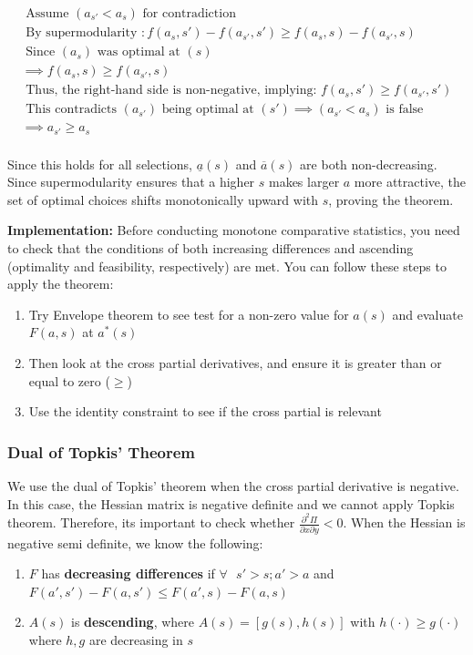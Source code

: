 \documentclass{article}
\begin{document}
\begin{align}
    \text{ Assume } ( a_{s'} < a_s ) \text{ for contradiction } \\
    \text{ By supermodularity }: f(a_s, s') - f(a_{s'}, s') \geq f(a_s, s) - f(a_{s'}, s) \\
    \text{ Since } ( a_s ) \text{ was optimal at } ( s) \\ \implies f(a_s, s) \geq f(a_{s'}, s) \\
    \text{ Thus, the right-hand side is non-negative, implying: } f(a_s, s') \geq f(a_{s'}, s') 
    \\
    \text{ This contradicts } ( a_{s'} ) \text{ being optimal at } ( s' ) \implies ( a_{s'} < a_s )\text{ is false } \\
    \implies  a_{s'} \geq a_s \\ 
\end{align}

Since this holds for all selections, \( \underline{a}(s) \) and \( \overline{a}(s) \) are both non-decreasing. Since supermodularity ensures that a higher \( s \) makes larger \( a \) more attractive, the set of optimal choices shifts monotonically upward with \( s \), proving the theorem.

\vspace{.2cm}
\noindent \textbf{Implementation:} Before conducting monotone comparative statistics, you need to check that the conditions of both increasing differences and ascending (optimality and feasibility, respectively) are met. You can follow these steps to apply the theorem:
    \begin{enumerate}
        \item Try Envelope theorem to see test for a non-zero value for $a(s)$ and evaluate $F(a,s)$ at $a^*(s)$
        \item Then look at the cross partial derivatives, and ensure it is greater than or equal to zero ($\geq$)
        \item Use the identity constraint to see if the cross partial is relevant 
    \end{enumerate}


\subsubsection{Dual of Topkis' Theorem}
We use the dual of Topkis' theorem when the cross partial derivative is negative. In this case, the Hessian matrix is negative definite and we cannot apply Topkis theorem. Therefore, its important to check whether $\frac{\partial ^2 \Pi}{\partial x \partial y} < 0$. When the Hessian is negative semi definite, we know the following: 
\begin{enumerate}
    \item $F$ has \textbf{decreasing differences} if $\forall \text{  } s' > s; a' > a$ and $F(a',s') - F(a,s') \leq F(a',s) - F(a,s)$ 
    \item $A(s)$ is \textbf{descending}, where $A(s) = [g(s), h(s)]$ with $h(\cdot) \geq g(\cdot)$ where $h, g$ are decreasing in $s$
\end{enumerate}
\end{document}
